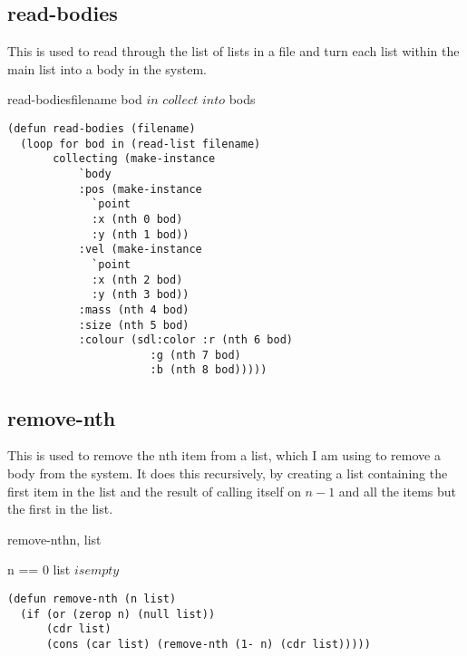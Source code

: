 \subsection{read-bodies}
This is used to read through the list of lists in a file and turn each list
within the main list into a body in the system. \\
\begin{pseudocode}{read-bodies}{filename}
	\FOREACH bod $ in $ 
	\DO $collect $  $ into $ bods\\
\end{pseudocode}

\begin{lstlisting}
(defun read-bodies (filename)
  (loop for bod in (read-list filename)
       collecting (make-instance 
		   `body
		   :pos (make-instance
			 `point
			 :x (nth 0 bod)
			 :y (nth 1 bod))
		   :vel (make-instance
			 `point
			 :x (nth 2 bod)	
			 :y (nth 3 bod))
		   :mass (nth 4 bod)
		   :size (nth 5 bod)
		   :colour (sdl:color :r (nth 6 bod)
				      :g (nth 7 bod)
				      :b (nth 8 bod)))))
\end{lstlisting}

\subsection{remove-nth}
This is used to remove the nth item from a list, which I am using to remove a
body from the system. It does this recursively, by creating a list containing
the first item in the list and the result of calling itself on $n - 1$ and all
the items but the first in the list.\\

\begin{pseudocode}{remove-nth}{n, list}
	\ENDPROCEDURE

	\ENDPROCEDURE

	\ENDPROCEDURE

	\MAIN
	\IF n == 0 \OR list $ is empty$ 
	\THEN {} 
	\ELSE
	\ENDMAIN
\end{pseudocode}
\begin{lstlisting}
(defun remove-nth (n list)
  (if (or (zerop n) (null list))
      (cdr list)
      (cons (car list) (remove-nth (1- n) (cdr list)))))
\end{lstlisting}

